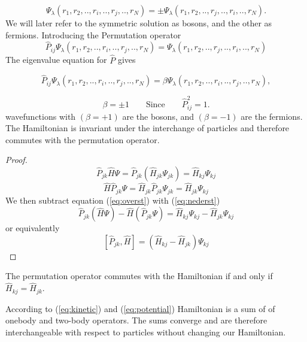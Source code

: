 \begin{equation}
\Psi_{\lambda}(r_1,r_2,..,r_i,..,r_j,..,r_N) = \pm \Psi_{\lambda}(r_1,r_2,..,r_j,..,r_i,..,r_N).
\end{equation}
%
We will later refer to the symmetric solution as bosons, and the other as fermions.
Introducing the Permutation operator 
%
\begin{equation}
\hat{P}_{ij}\Psi_\lambda(r_1,r_2,..,r_i,..,r_j,..,r_N) = \Psi_\lambda(r_1,r_2,..,r_j,..,r_i,..,r_N) 
 \label{eq:poperator}
\end{equation}
%
The eigenvalue equation for $\hat{P}$ gives 

\begin{equation}
 \hat{P}_{ij}\Psi_\lambda(r_1,r_2,..,r_i,..,r_j,..,r_N) = \beta \Psi_\lambda(r_1,r_2,..,r_i,..,r_j,..,r_N),
 \label{eq:poperatoreq}
\end{equation}

\begin{equation}
\beta = \pm 1 \qquad \text{Since} \qquad \hat{P}^2_{ij} = 1.
 \label{eq:beta} 
\end{equation}
%
wavefunctions with $(\beta = +1)$ are the bosons, and $(\beta = -1)$ are the fermions. The Hamiltonian is invariant under the interchange of particles and therefore commutes with the permutation operator.

\begin{proof}
\begin{equation}
\hat{P}_ {jk} \hat{H} \Psi = \hat{P}_{jk}(\hat{H}_{jk}\Psi_{jk}) =  \hat{H}_{kj}\Psi_{kj} 
\label{eq:overst}
\end{equation}
%
\begin{equation}
\hat{H} \hat{P}_{jk} \Psi = \hat{H}_{jk}\hat{P}_{jk}\Psi_{jk} = \hat{H}_{jk} \Psi_{kj}
\label{eq:nederst}
\end{equation}
%
We then subtract equation (\ref{eq:overst}) with (\ref{eq:nederst}) 
%
\begin{equation}
 \hat{P}_{jk}(\hat{H}\Psi) - \hat{H}(\hat{P}_{jk}\Psi) = \hat{H}_{kj}\Psi_{kj} - \hat{H}_{jk} \Psi_{kj}
\end{equation}
%
or equivalently
%
\begin{equation}
 \left[\hat{P}_{jk},\hat{H} \right] = \left(\hat{H}_{kj} - \hat{H}_{jk}\right)\Psi_{kj}
\end{equation}
\end{proof}
%
\noindent The permutation operator commutes with the Hamiltonian if and only if $\hat{H}_{kj} = \hat{H}_{jk}$.

According to (\ref{eq:kinetic}) and (\ref{eq:potential}) Hamiltonian is a sum of of onebody and two-body operators. The sums converge and are therefore interchangeable with respect to particles without changing our Hamiltonian.

